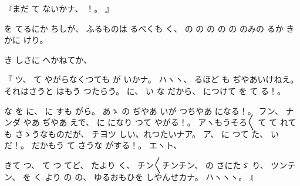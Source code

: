 『まだ
て
ないかナ、
%
！。
』

を
てるにか
ちしが、
%
ふるものは
るべくも
く、
%
の
の
の
の
の%
のみの
るか
きかに
けり。

き
しさに
へかねてか、

『
ツ、
%
て
やがらなくつても
が
いかナ。
%
ハヽヽ、
%
るほど
も
ぢやあいけねえ。
%
それはさうと
はもう
つたらう。
%
に、%
%
い
な
だから、
%
につけて
を
て
る！。

な
を
に、
%
に
すも
がら。
%
あゝ
の
ぢやあ
いが
つちやあ
になる！。
%
フン、
%
ナンダ
やあ
ぢやあ
えで、
%
に
になり
つて
やがる！。
%
アヽもうそろ〳〵
て
て
れても
さゝうなものだが、
%
チヨツ
しい、れつたいナア。
%
ア、
%
に
つて
た、
%
い
だ！。
%
だかもう
て
さうな
がする！。
%
エヽト、

きて
つ、
%
て
つ
てど、
%
たより
く、
%
チン〳〵チンチン、
%
の
さにたゞ
り、
%
ツンテン、
%
を
く
より
の
の、
%
ゆるおもひを
しやんせカナ。
%
ハヽヽヽ。
』


